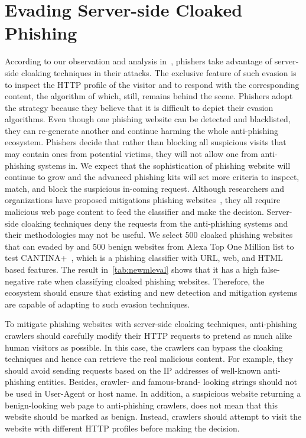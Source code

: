 \section{Evading Server-side Cloaked Phishing}

According to our observation and analysis in~, phishers take advantage of server-side cloaking techniques in their attacks.
The exclusive feature of such evasion is to inspect the HTTP profile of the visitor and to respond with the corresponding content,
the algorithm of which, still, remains behind the scene.
Phishers adopt the strategy because they believe that it is difficult to depict their evasion algorithms.
Even though one phishing website can be detected and blacklisted, they can re-generate another and continue harming the whole anti-phishing ecosystem.
Phishers decide that rather than blocking all suspicious visits that may contain ones from potential victims, they will not allow one from anti-phishing systems in.
We expect that the sophistication of phishing website will continue to grow and the advanced phishing kits will set more criteria to inspect, match, and block the suspicious in-coming request.
Although researchers and organizations have proposed mitigations phishing websites~\cite{xiang2011cantina+, lin2021phishpedia}, they all require malicious web page content to feed the classifier and make the decision.
Server-side cloaking techniques deny the requests from the anti-phishing systems and their methodologies may not be useful.
We select 500 cloaked phishing websites that can evaded by \spartacus and 500 benign websites from Alexa Top One Million list to test CANTINA+~\cite{xiang2011cantina+}, which is a phishing classifier with URL, web, and HTML based features.
The result in~\autoref{tab:newmleval} shows that it has a high false-negative rate when classifying cloaked phishing websites.
Therefore, the ecosystem should ensure
that existing and new detection and mitigation systems are capable of adapting to such evasion techniques.

\newmleval

To mitigate phishing websites with server-side cloaking techniques, anti-phishing crawlers should carefully modify their HTTP requests to pretend as much alike human visitors as possible.
In this case, the crawlers can bypass the cloaking techniques and hence can retrieve the real malicious content.
For example, they should avoid sending requests based on the IP addresses of well-known anti-phishing entities.
Besides, crawler- and famous-brand- looking strings should not be used in User-Agent or host name.
In addition, a suspicious website returning a benign-looking web page to anti-phishing crawlers, does not mean that this website should be marked as benign.
Instead, crawlers should attempt to visit the website with different HTTP profiles before making the decision.

